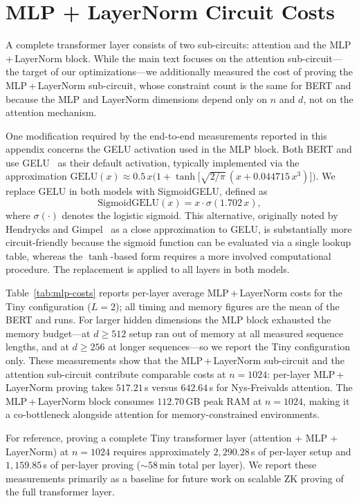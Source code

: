 \documentclass[runningheads]{llncs}
\begin{document}
\section{MLP + LayerNorm Circuit Costs}
\label{appx:mlp-costs}

A complete transformer layer consists of two sub-circuits: attention and the MLP\,+\,LayerNorm block. While the main text focuses on the attention sub-circuit---the target of our \name optimizations---we additionally measured the cost of proving the MLP\,+\,LayerNorm sub-circuit, whose constraint count is the same for BERT and \nystromformer because the MLP and LayerNorm dimensions depend only on $n$ and $d$, not on the attention mechanism.

One modification required by the end-to-end measurements reported in this appendix concerns the GELU activation used in the MLP block. Both BERT and \nystromformer use GELU~\cite{GELU} as their default activation, typically implemented via the approximation $\text{GELU}(x) \approx 0.5\,x\bigl(1 + \tanh\bigl[\sqrt{2/\pi}\,(x + 0.044715\,x^3)\bigr]\bigr)$.
We replace GELU in both models with SigmoidGELU, defined as
\[
    \text{SigmoidGELU}(x) = x \cdot \sigma(1.702\,x),
\]
where $\sigma(\cdot)$ denotes the logistic sigmoid. This alternative, originally noted by Hendrycks and Gimpel~\cite{GELU} as a close approximation to GELU, is substantially more circuit-friendly because the sigmoid function can be evaluated via a single lookup table, whereas the $\tanh$-based form requires a more involved computational procedure. The replacement is applied to all layers in both models.

Table~\ref{tab:mlp-costs} reports per-layer average MLP\,+\,LayerNorm costs for the Tiny configuration ($L{=}2$); all timing and memory figures are the mean of the BERT and \nystrom runs.
For larger hidden dimensions the MLP block exhausted the memory budget---at $d{\geq}512$ setup ran out of memory at all measured sequence lengths, and at $d{\geq}256$ at longer sequences---so we report the Tiny configuration only.
These measurements show that the MLP\,+\,LayerNorm sub-circuit and the attention sub-circuit contribute comparable costs at $n{=}1024$: per-layer MLP\,+\,LayerNorm proving takes $517.21$\,s versus $642.64$\,s for Nys-Freivalds attention. The MLP\,+\,LayerNorm block consumes $112.70$\,GB peak RAM at $n{=}1024$, making it a co-bottleneck alongside attention for memory-constrained environments.

For reference, proving a complete Tiny transformer layer (attention + MLP + LayerNorm) at $n{=}1024$ requires approximately $2{,}290.28$\,s of per-layer setup and $1{,}159.85$\,s of per-layer proving (${\sim}58$\,min total per layer). We report these measurements primarily as a baseline for future work on scalable ZK proving of the full transformer layer.
\end{document}
